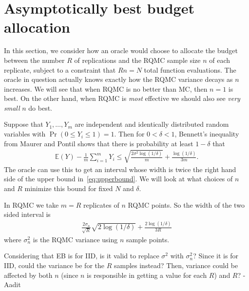 \documentclass{article}
\newcommand{\aadit}[1]{\begingroup\color{orange}#1\endgroup}
\renewcommand{\le}{\leqslant}
\newcommand{\e}{\mathbb{E}}
\begin{document}
\section{Asymptotically best budget allocation}

In this section, we consider how an oracle would choose
to allocate the budget between the number $R$ of replications
and the RQMC sample size $n$ of each replicate, subject to
a constraint that $Rn=N$ total function evaluations.  The
oracle in question actually knows exactly how the RQMC
variance decays as $n$ increases.  We will see that
when RQMC is no better than MC, then $n=1$ is best.
On the other hand, when RQMC is {\sl most} effective we should 
also see {\sl very small} $n$ do best.

Suppose that $Y_1,\dots,Y_m$ are independent and identically
distributed random variables with $\Pr(0\le Y_i\le 1)=1$.
Then for $0<\delta<1$,
Bennett's inequality from Maurer and Pontil \cite{maurer2009empirical} shows that
there is probability at least $1-\delta$  that
\begin{align}\label{eq:upperbound}
\e(Y) -   \frac1m\sum_{i=1}^mY_i \le \sqrt{\frac{2\sigma^2\log(1/\delta)}m}
+ \frac{\log(1/\delta)}{3m}.
\end{align}
The oracle can use this to get an interval whose width is
twice the right hand side of the upper bound in~\eqref{eq:upperbound}.
We will look at what choices of $n$ and $R$ minimize this bound for fixed $N$ and $\delta$.

In RQMC we take $m=R$ replicates of $n$ RQMC points.
So the width of the two sided interval is 
\begin{align}\label{eq:thewidth}
\frac{2\sigma_n}{\sqrt{R}}\sqrt{2\log(1/\delta)}  + \frac{2\log(1/\delta)}{3R}
\end{align}
where $\sigma^2_n$ is the RQMC variance using $n$ sample  points.

\aadit{Considering that EB is for IID, is it valid to replace $\sigma^2$ with $\sigma^2_n$? Since it is for IID, could the variance be for the $R$ samples instead? Then, variance could be affected by both $n$ (since $n$ is responsible in getting a value for each $R$) and $R$? - Aadit}
\end{document}
